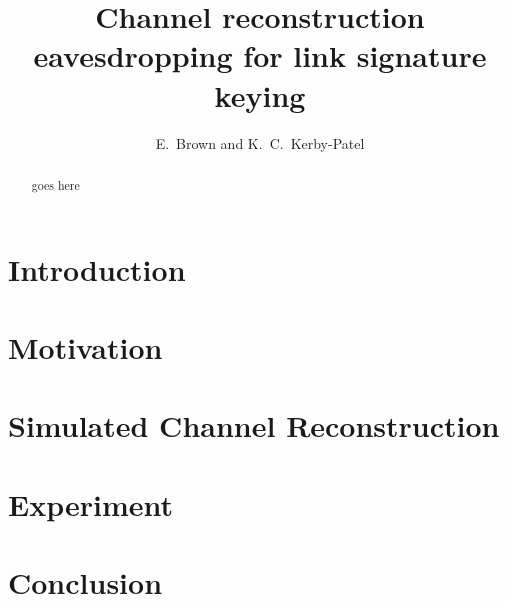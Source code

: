 \documentclass{ieeetran}
\title{Channel reconstruction eavesdropping for link signature keying}
\author{E.~Brown and K.~C.~Kerby-Patel}
\date{}
\begin{document}
\begin{abstract}goes here\end{abstract}
\section{Introduction}
\section{Motivation}
	


\section{Simulated Channel Reconstruction}

\section{Experiment}
\section{Conclusion}
\end{document}
